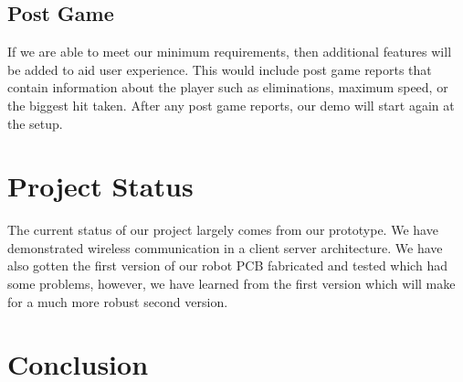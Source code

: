 \documentclass[11pt]{ieeeconf}
\begin{document}
\subsection{Post Game}
If we are able to meet our minimum requirements, then additional features will be added to aid user experience. This would include post game reports that contain information about the player such as eliminations, maximum speed, or the biggest hit taken. After any post game reports, our demo will start again at the setup.

\section{Project Status}
The current status of our project largely comes from our prototype. We have demonstrated wireless communication in a client server architecture. We have also gotten the first version of our robot PCB fabricated and tested which had some problems, however, we have learned from the first version which will make for a much more robust second version. 

\section{Conclusion}



\end{document}
